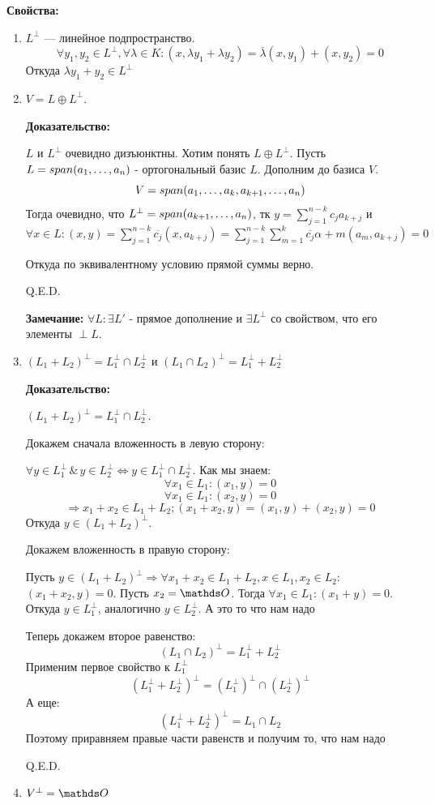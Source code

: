 \textbf{Свойства:}
\begin{enumerate}
    \item $L^{\perp}$ --- линейное подпространство. 
    $$\forall y_1,y_2 \in L^{\perp}, \forall \lambda \in K: (x,\lambda y_1 + \lambda y_2) = \overline{\lambda} (x,y_1) + (x,y_2) = 0$$
    Откуда $\lambda y_1  + y_2 \in L^{\perp}$

    \item $V = L \oplus L^{\perp}$. 

    \textbf{Доказательство:}

    $L$ и $L^\perp$ очевидно дизъюнктны. Хотим понять $L \oplus L^{\perp}$. Пусть $L = span (a_1,\ldots,a_n)$ - ортогональный базис $L$. Дополним до базиса $V$. $$V = span(a_1,\ldots,a_k,a_{k+1},\ldots, a_n)$$
    Тогда очевидно, что $L^\perp = span (a_{k+1}, \ldots,a_n)$, тк $y = \sum\limits_{j=1}^{n-k} c_j a_{k+j}$ и $\forall x\in L: (x,y) = \sum\limits_{j=1}^{n-k}\overline{c_j}(x, a_{k+j}) = \sum\limits_{j=1}^{n-k}\sum\limits_{m=1}^k \overline{c_j}\alpha+m (a_m,a_{k+j})=0$

    Откуда по эквивалентному условию прямой суммы верно.

    \hfill Q.E.D.

    \textbf{Замечание:} $\forall L: \exists L'$ - прямое дополнение и $\exists L^{\perp}$ со свойством, что его элементы $\perp L$. 

    \item $(L_1+L_2)^\perp = L_1^\perp \cap L_2^\perp$ и $(L_1 \cap L_2)^\perp = L_1^{\perp}+ L_2^{\perp}$

    \textbf{Доказательство:}

    $(L_1+L_2)^{\perp} = L_1^{\perp} \cap L_2^{\perp}$.

    Докажем сначала вложенность в левую сторону:

    $\forall  y \in L_1^\perp \, \&\, y\in L_2^\perp \Leftrightarrow y\in L_1^\perp \cap L_2^\perp$. Как мы знаем:
    $$\forall x_1 \in L_1: (x_1,y)=0$$
    $$\forall x_1 \in L_1: (x_2,y)=0$$
    $$\Rightarrow x_1 + x_2 \in L_1 + L_2; (x_1 + x_2, y) = (x_1,y) + (x_2,y)=0$$
    Откуда $y\in (L_1+L_2)^\perp$.

    Докажем вложенность в правую сторону:

    Пусть $y \in (L_1 + L_2)^\perp \Rightarrow \forall x_1 + x_2 \in L_1 + L_2,x \in L_1, x_2 \in L_2$: $(x_1+x_2,y)=0$. Пусть $x_2 = \zero$. Тогда $\forall x_1 \in L_1: (x_1 + y)=0$. Откуда $y \in L_1^\perp$, аналогично $y \in L_2^\perp$. А это то что нам надо

    Теперь докажем второе равенство:
$$(L_1 \cap L_2)^\perp = L_1^{\perp}+ L_2^{\perp}$$
    Применим первое свойство к $L_1^{\perp}$ 
    $$(L_1^\perp + L_2^\perp)^\perp = (L_1^\perp)^\perp \cap (L_2^\perp)^\perp$$
  А еще:
    $$(L_1^\perp + L_2^\perp)^\perp = L_1 \cap L_2$$
    Поэтому приравняем правые части равенств и получим то, что нам надо
    
    
    \hfill Q.E.D.
    \item $V^\perp  = \zero$
\end{enumerate}

